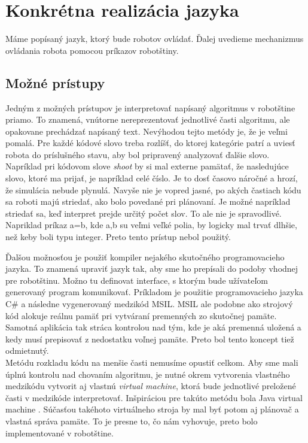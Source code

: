 \section {Konkrétna realizácia jazyka}
Máme popísaný jazyk, ktorý bude robotov ovládať. Ďalej uvedieme mechanizmus ovládania robota pomocou príkazov robotštiny.
\subsection{Možné prístupy}
Jedným z možných prístupov je interpretovať napísaný algoritmus v robotštine priamo. To znamená, vnútorne nereprezentovať jednotlivé časti algoritmu, ale opakovane prechádzať napísaný text. Nevýhodou tejto metódy je, že je veľmi pomalá. Pre každé kódové slovo treba rozlíšť, do ktorej kategórie patrí a uviesť robota do príslušného stavu, aby bol pripravený analyzovať ďalšie slovo. Napríklad pri kódovom slove {\it shoot} by si mal externe pamätať, že nasledujúce slovo, ktoré ma prijať, je napríklad celé číslo. Je to dosť časovo náročné a hrozí, že simulácia nebude plynulá. Navyše nie je vopred jasné, po akých častiach kódu sa roboti majú striedať, ako bolo povedané pri plánovaní. Je možné napríklad striedať sa, keď interpret prejde určitý počet slov. To ale nie je spravodlivé. Napriklad príkaz a=b, kde a,b su veľmi veľké polia, by logicky mal trvať dlhšie, než keby boli typu integer. Preto tento prístup nebol použitý.

Ďalšou možnosťou je použiť kompiler nejakého skutočného programovacieho jazyka. To znamená upraviť jazyk tak, aby sme ho prepísali do podoby vhodnej pre robotštinu. Možno tu definovat interface, s ktorým bude užívateľom generovaný program komunikovať. Príkladom je použitie programovacieho jazyka C\# a následne vygenerovaný medzikód MSIL. MSIL ale podobne ako strojový kód alokuje reálnu pamäť pri vytváraní premenných zo skutočnej pamäte. Samotná aplikácia tak stráca kontrolou nad tým, kde je aká premenná uložená a kedy musí prepisovať z nedostatku voľnej pamäte. Preto bol tento koncept tiež odmietnutý.\\
Metódu rozkladu kódu na menšie časti nemusíme opustiť celkom. Aby sme mali úplnú kontrolu nad chovaním algoritmu, je nutné okrem vytvorenia vlastného medzikódu vytvorit aj vlastnú {\it virtual machine}, ktorá bude jednotlivé preložené časti v medzikóde interpretovať. Inšpiráciou pre takúto metódu bola Java virtual machine \cite{java}. Súčasťou takéhoto virtuálneho stroja by mal byť potom aj plánovač a vlastná správa pamäte. To je  presne to, čo nám vyhovuje, preto bolo implementované v robotštine.\\ %

